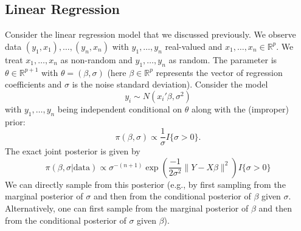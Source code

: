 \documentclass{scrartcl}
\newcommand{\R}{{\mathbb R}}
\begin{document}
\subsection{Linear Regression}
  Consider the linear regression model that we discussed
  previously. We observe data $(y_1, x_1), \dots, (y_n, x_n)$ with
  $y_1, \dots, 
  y_n$ real-valued and $x_1, \dots, x_n \in \R^p$. We treat
  $x_1, \dots, x_n$ as non-random and $y_1, \dots, y_n$ as random. The
  parameter is $\theta \in \R^{p+1}$ with $\theta = (\beta, \sigma)$
  (here $\beta \in \R^p$ represents the vector of regression coefficients and
  $\sigma$ is the noise standard deviation). Consider the model 
  \begin{equation*}
   y_i  \sim N(x_i' \beta, \sigma^2)
 \end{equation*}
 with $y_1, \dots, y_n$ being independent conditional on $\theta$
 along with the (improper) prior:
 \begin{equation*}
  \pi(\beta, \sigma) \propto \frac{1}{\sigma} I\{\sigma > 0\}. 
\end{equation*}
The exact joint posterior is given by
\begin{equation}\label{expo_reg}
  \pi(\beta, \sigma | \text{data})  \propto
  \sigma^{-(n+1)} \exp \left(\frac{-1}{2 \sigma^2} \|Y  - X \beta\|^2
  \right) I\{\sigma > 0\}
\end{equation}
We can directly sample from this posterior (e.g., by first sampling
from the marginal posterior of $\sigma$ and then from the conditional
posterior of $\beta$ given $\sigma$. Alternatively, one can first
sample from the marginal posterior of $\beta$ and then from the
conditional posterior of $\sigma$ given $\beta$).
\end{document}
